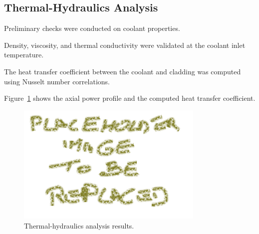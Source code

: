 \subsection{Thermal-Hydraulics Analysis}
Preliminary checks were conducted on coolant properties.

Density, viscosity, and thermal conductivity were validated at the coolant inlet temperature.

The heat transfer coefficient between the coolant and cladding was computed using Nusselt number correlations.

Figure~\ref{fig:thermal_hydraulics} shows the axial power profile and the computed heat transfer coefficient.

\begin{figure}[H]
    \centering
    \includegraphics[width=0.8\textwidth]{placeholder.png}
    \caption{Thermal-hydraulics analysis results.}
    \label{fig:thermal_hydraulics}
    \end{figure}